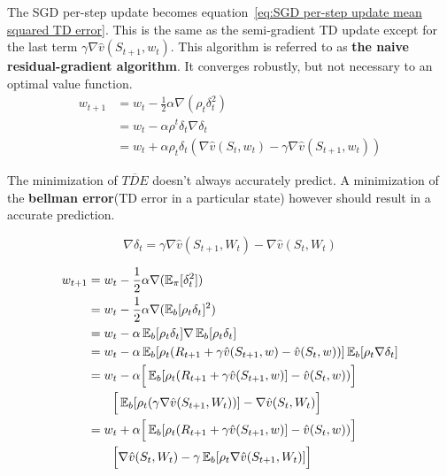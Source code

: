The SGD per-step update becomes equation~\ref{eq:SGD per-step update mean squared TD error}. This is the same as the semi-gradient TD update except for the last term $\gamma \nabla\hat{v}(S_{t+1},w_t)$. This algorithm is referred to as \textbf{the naive residual-gradient algorithm}. It converges robustly, but not necessary to an optimal value function.
\begin{equation}
\begin{split}
w_{t+1} & = w_t - \frac{1}{2}\alpha \nabla(\rho_t \delta_t^2) \\
& = w_t - \alpha \rho^t \delta_t \nabla\delta_t \\
& = w_t + \alpha \rho_t\delta_t(\nabla \hat{v}(S_t, w_t) - \gamma \nabla \hat{v}(S_{t+1}, w_t)) 
\end{split}
\label{eq:SGD per-step update mean squared TD error}
\end{equation}

The minimization of $\overline{TDE}$ doesn't always accurately predict. A minimization of the \textbf{bellman error}(TD error in a particular state) however should result in a accurate prediction.

\begin{equation}
\nabla \delta_t = \gamma \nabla\hat{v}(S_{t+1}, W_t) - \nabla\hat{v}(S_t, W_t)
\label{eq:gradient TD error}
\end{equation}

\begin{equation}
\begin{split}
w_{t+1} & = w_t - \frac{1}{2} \alpha \nabla (\operatorname{\mathbb{E}}_{\pi}[{\delta_t^2}]) \\
& = w_t - \frac{1}{2}\alpha\nabla(\operatorname{\mathbb{E}}_b[\rho_t\delta_t]^2) \\
& = w_t - \alpha \operatorname{\mathbb{E}}_b[\rho_t\delta_t] \nabla\operatorname{\mathbb{E}}_b[\rho_t\delta_t] \\
& = w_t - \alpha \operatorname{\mathbb{E}}_b[\rho_t(R_{t+1} + \gamma \hat{v}(S_{t+1}, w) - \hat{v}(S_t, w))] \operatorname{\mathbb{E}}_b[\rho_t\nabla\delta_t] \\
& = w_t - \alpha \Big[\operatorname{\mathbb{E}}_b[\rho_t(R_{t+1} + \gamma \hat{v}(S_{t+1}, w)] - \hat{v}(S_t, w))\Big] \\ 
& \qquad \Big[ \operatorname{\mathbb{E}}_b[\rho_t (\gamma \nabla\hat{v}(S_{t+1}, W_t) )] - \nabla\hat{v}(S_t, W_t) \Big]\\
& = w_t + \alpha \Big[\operatorname{\mathbb{E}}_b[\rho_t(R_{t+1} + \gamma \hat{v}(S_{t+1}, w)] - \hat{v}(S_t, w))\Big] \\ 
& \qquad \Big[  \nabla\hat{v}(S_t, W_t) - \gamma\operatorname{\mathbb{E}}_b[\rho_t \nabla\hat{v}(S_{t+1}, W_t) ]\Big]\\
\end{split}
\end{equation}

